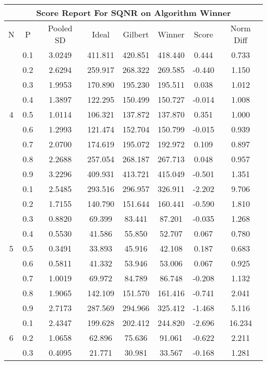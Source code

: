 \documentclass[11pt,a4paper]{report}
\begin{document}
\begin{longtable}{ | c | c || c | c | c | c | c | c | }
\hline
\multicolumn{8}{|c|}{ Score Report For SQNR on Algorithm Winner} \\
\hline
N & P & Pooled SD &  Ideal &  Gilbert & Winner  & Score & Norm Diff \\
 \hline
 \hline
 \endhead
\multirow{9}{*}{4} & 0.1 & 3.0249 & 411.811 & 420.851 & 418.440 & 0.444 & 0.733 \\
 & 0.2 & 2.6294 & 259.917 & 268.322 & 269.585 & -0.440 & 1.150 \\
 & 0.3 & 1.9953 & 170.890 & 195.230 & 195.511 & 0.038 & 1.012 \\
 & 0.4 & 1.3897 & 122.295 & 150.499 & 150.727 & -0.014 & 1.008 \\
 & 0.5 & 1.0114 & 106.321 & 137.872 & 137.870 & 0.351 & 1.000 \\
 & 0.6 & 1.2993 & 121.474 & 152.704 & 150.799 & -0.015 & 0.939 \\
 & 0.7 & 2.0700 & 174.619 & 195.072 & 192.972 & 0.109 & 0.897 \\
 & 0.8 & 2.2688 & 257.054 & 268.187 & 267.713 & 0.048 & 0.957 \\
 & 0.9 & 3.2296 & 409.931 & 413.721 & 415.049 & -0.501 & 1.351 \\
 \hline
\multirow{9}{*}{5} & 0.1 & 2.5485 & 293.516 & 296.957 & 326.911 & -2.202 & 9.706 \\
 & 0.2 & 1.7155 & 140.790 & 151.644 & 160.441 & -0.590 & 1.810 \\
 & 0.3 & 0.8820 & 69.399 & 83.441 & 87.201 & -0.035 & 1.268 \\
 & 0.4 & 0.5530 & 41.586 & 55.850 & 52.707 & 0.067 & 0.780 \\
 & 0.5 & 0.3491 & 33.893 & 45.916 & 42.108 & 0.187 & 0.683 \\
 & 0.6 & 0.5811 & 41.332 & 53.946 & 53.006 & 0.067 & 0.925 \\
 & 0.7 & 1.0019 & 69.972 & 84.789 & 86.748 & -0.208 & 1.132 \\
 & 0.8 & 1.9065 & 142.109 & 151.570 & 161.416 & -0.741 & 2.041 \\
 & 0.9 & 2.7173 & 287.569 & 294.966 & 325.412 & -1.468 & 5.116 \\
 \hline
\multirow{9}{*}{6} & 0.1 & 2.4347 & 199.628 & 202.412 & 244.820 & -2.696 & 16.234 \\
 & 0.2 & 1.0658 & 62.896 & 75.636 & 91.061 & -0.622 & 2.211 \\
 & 0.3 & 0.4095 & 21.771 & 30.981 & 33.567 & -0.168 & 1.281 \\

\end{longtable}
\end{document}
